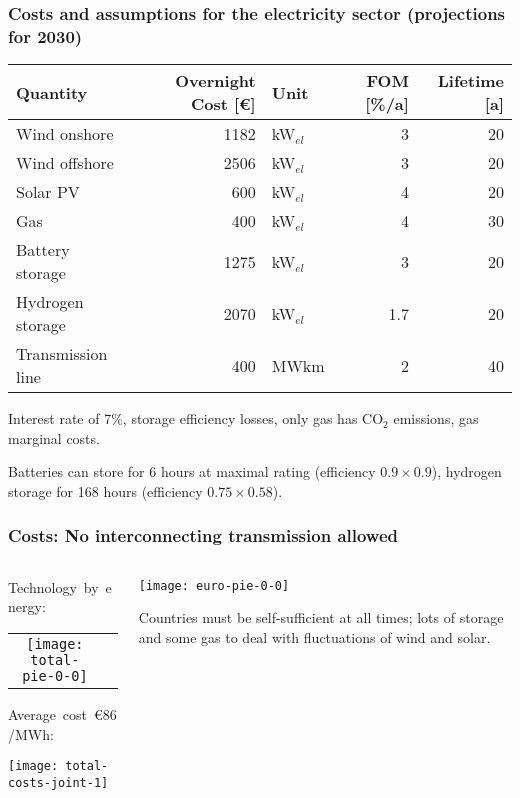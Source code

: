 \documentclass[10pt,aspectratio=169,dvipsnames]{beamer}
\def\co2{CO${}_2$}
\def\el{${}_{el}$}
\begin{document}
\begin{frame}
  \frametitle{Costs and assumptions for the electricity sector (projections for 2030)}

  \begin{table}
\centering
\begin{tabular}{@{}lrlrr@{}}
\toprule
Quantity                &Overnight  Cost [\euro]  &Unit & FOM [\%/a] & Lifetime [a] \\
\midrule
Wind onshore    &1182   &kW\el &3 & 20   \\
Wind offshore  &2506   &kW\el  &3& 20  \\
Solar PV           &600   &kW\el &4 & 20   \\
Gas             &400    &kW\el  &4& 30  \\
Battery storage         &1275   &kW\el  & 3 & 20 \\
Hydrogen storage        &2070   &kW\el  & 1.7 &20 \\
Transmission line       &400    &MWkm & 2 & 40\\
\bottomrule
\end{tabular}
\end{table}
  Interest rate of 7\%, storage efficiency losses, only gas has \co2 emissions, gas marginal costs.

  Batteries can store for 6 hours at maximal rating (efficiency $0.9\times 0.9$), hydrogen storage for 168 hours (efficiency $0.75\times 0.58$).
\end{frame}






\begin{frame}
  \frametitle{Costs: No interconnecting transmission allowed}



\begin{columns}[T]
  \begin{column}{4.9cm}

  Technology~by~energy:
  \begin{tabular}{cc}
    \texttt{[image: total-pie-0-0]} &
  \end{tabular}


  Average~cost~\alert{\euro 86/MWh}:

  \texttt{[image: total-costs-joint-1]}

  \end{column}

  \begin{column}{9cm}
    \centering
    \texttt{[image: euro-pie-0-0]}

    \raggedright
    Countries must be self-sufficient at all times; lots of storage and some gas to deal with fluctuations of wind and solar.
  \end{column}

\end{columns}
\end{frame}
\end{document}
